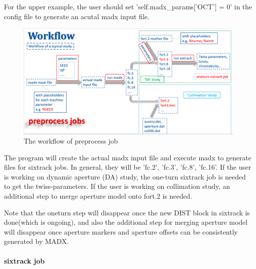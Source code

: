 For the upper example, the user should set 'self.madx\_params['OCT'] = 0' in the config file to generate an acutal madx input file.

\begin{figure}[h]
\includegraphics[width=17cm]{preprocess.png}
\caption{The workflow of preprocess job}
\label{fig1}
\centering
\end{figure}

The program will create the actual madx input file and execute madx to generate files for sixtrack jobs. In general, they will be 'fc.2', 'fc.3', 'fc.8', 'fc.16'. If the user is working on dynamic aperture (DA) study, the one-turn sixtrack job is needed to get the twiss-parameters. If the user is working on collimation study, an additional step to merge aperture model onto fort.2 is needed.

Note that the oneturn step will disappear once the new DIST block in sixtrack is done(which is ongoing), and also the additional step for merging aperture model will disappear once aperture markers and aperture offsets can be consistently generated by MADX.


\paragraph{sixtrack job}~

